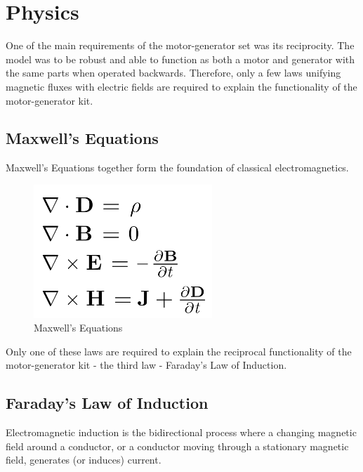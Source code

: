 \section{Physics}
One of the main requirements of the motor-generator set was its reciprocity. The model was to be robust and able to function as both a motor and generator with the same parts when operated backwards. Therefore, only a few laws unifying magnetic fluxes with electric fields are required to explain the functionality of the motor-generator kit.

    \subsection{Maxwell's Equations}
    Maxwell's Equations together form the foundation of classical electromagnetics. \cite{maxwell_ref} \\

        \begin{figure}[ht]
            \begin{center}
                \includegraphics[width=0.6\textwidth]{figures/maxwell.png}
                \caption{Maxwell's Equations} \label{fig:maxwell}
            \end{center}
        \end{figure}

    \noindent
    Only one of these laws are required to explain the reciprocal functionality of the motor-generator kit - the third law - Faraday's Law of Induction.

    \subsection{Faraday's Law of Induction}
    Electromagnetic induction is the bidirectional process where a changing magnetic field around a conductor, or a conductor moving through a stationary magnetic field, generates (or induces) current.

